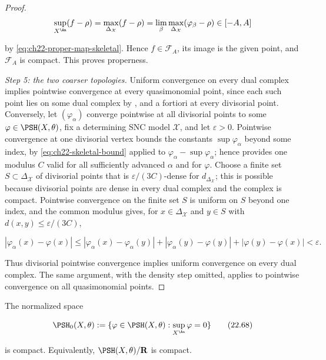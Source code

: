 \begin{proof}
\[
 \sup_{X^{\An}}(f-\rho)=\max_{\Delta_{\mathcal X}}(f-\rho)
 =\lim_\beta\max_{\Delta_{\mathcal X}}(\varphi_\beta-\rho)\in[-A,A]
\]

by \eqref{eq:ch22-proper-map-skeletal}.  Hence $f\in\mathcal F_A$, its
image is the given point, and $\mathcal F_A$ is compact.  This proves
properness.

\emph{Step 5: the two coarser topologies.}  Uniform convergence on every
dual complex implies pointwise convergence at every quasimonomial point,
since each such point lies on some dual complex by
, and a fortiori at every divisorial point.
Conversely, let $(\varphi_\alpha)$ converge pointwise at all divisorial
points to some $\varphi\in\PSH(X,\theta)$, fix a determining SNC model
$\mathcal X$, and let $\varepsilon>0$.  Pointwise convergence at one
divisorial vertex bounds the constants $\sup\varphi_\alpha$ beyond some
index, by \eqref{eq:ch22-skeletal-bound} applied to
$\varphi_\alpha-\sup\varphi_\alpha$; hence
 provides one modulus $C$ valid for all
sufficiently advanced $\alpha$ and for $\varphi$.  Choose a finite set
$S\subset\Delta_{\mathcal X}$ of divisorial points that is
$\varepsilon/(3C)$-dense for $d_{\Delta_{\mathcal X}}$; this is possible
because divisorial points are dense in every dual complex and the complex is
compact.  Pointwise convergence on the finite set $S$ is uniform on
$S$ beyond one index, and the common modulus gives, for
$x\in\Delta_{\mathcal X}$ and $y\in S$ with
$d(x,y)\leq\varepsilon/(3C)$,

\[
 |\varphi_\alpha(x)-\varphi(x)|
 \leq|\varphi_\alpha(x)-\varphi_\alpha(y)|
   +|\varphi_\alpha(y)-\varphi(y)|
   +|\varphi(y)-\varphi(x)|
 <\varepsilon .
\]

Thus divisorial pointwise convergence implies uniform convergence on every
dual complex.  The same argument, with the density step omitted, applies to
pointwise convergence on all quasimonomial points.
\end{proof}

\begin{theorem}\label{thm:bfj-psh-compactness}
The normalized space

\[
 \PSH_0(X,\theta)
 :=\{\varphi\in\PSH(X,\theta):
                    \sup_{X^{\An}}\varphi=0\}
\tag{22.68}\label{eq:ch22-normalized-space}
\]

is compact.  Equivalently, $\PSH(X,\theta)/\mathbf R$ is compact.
\end{theorem}


